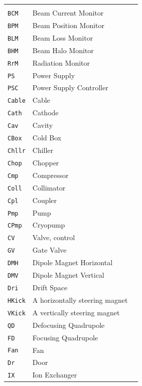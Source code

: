 \documentclass[11pt
  , a4paper
  , article
  , oneside
]{memoir}
\begin{document}
\begin{center}
\begin{longtable}[t]{>{\raggedleft\arraybackslash}p{3cm} |p{7cm}| p{3cm}}
&\\
\texttt{BCM}   & Beam Current Monitor & \\
\texttt{BPM}   & Beam Position Monitor & \\
\texttt{BLM}   & Beam Loss Monitor & \\
\texttt{BHM}   & Beam Halo Monitor & \\
\texttt{RrM}   & Radiation Monitor & \\
\texttt{PS}    & Power Supply & \\
\texttt{PSC}   & Power Supply Controller & \\
\texttt{Cable} & Cable & \\
\texttt{Cath}  & Cathode & \\
\texttt{Cav}   & Cavity & \\
\texttt{CBox}  & Cold Box & \\
\texttt{Chllr} & Chiller &\\
\texttt{Chop}  & Chopper & \\
\texttt{Cmp}   & Compressor & \\
\texttt{Coll}  & Collimator &\\
\texttt{Cpl}   & Coupler & \\
\texttt{Pmp}   & Pump    & \\
\texttt{CPmp}  & Cryopump & \\
\texttt{CV}    & Valve, control &\\
\texttt{GV}    & Gate Valve & \\
\texttt{DMH}   & Dipole Magnet Horizontal & \\
\texttt{DMV}   & Dipole Magnet Vertical & \\
\texttt{Dri}   & Drift Space &\\
\texttt{HKick} & A horizontally steering magnet & \\
\texttt{VKick} & A vertically steering magnet &\\
\texttt{QD}    & Defocusing Quadrupole & \\
\texttt{FD}    & Focusing Quadrupole & \\

\texttt{Fan}   & Fan & \\
\texttt{Dr}    & Door & \\
\texttt{IX}    & Ion Exchanger & \\


\end{longtable}
\end{center}
\end{document}

